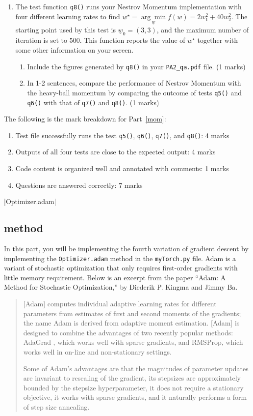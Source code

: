 \documentclass{article}
\theoremstyle{definition}
\begin{document}
\begin{enumerate}[label=\ref{mom}.\alph*]
	\item \label{hhh}The test function \verb|q8()| runs your Nestrov Momentum implementation with four different learning rates to find $\underline{w}^\star = \underset{\underline{w}}{\arg \min} f(\underline{w}) = 2 w_1^2 + 40w_2^2$. The starting point used by this test is $\underline{w}_0=(3,3)$, and the maximum number of iteration is set to $500$. This function reports the value of $w^\star$ together with some other information on your screen.
	\begin{enumerate}[label=\ref{hhh}.\roman*]
		\item Include the figures generated by \verb|q8()| in your \verb|PA2_qa.pdf| file. (1 marks)
		\item In 1-2 sentences, compare the performance of Nestrov Momentum with the heavy-ball momentum by comparing the outcome of tests \verb|q5()| and \verb|q6()| with that of \verb|q7()| and \verb|q8()|. (1 marks)
	\end{enumerate}
\end{enumerate}
The following is the mark breakdown for Part~\ref{mom}:
\begin{enumerate}[label=(\roman*)]
	\item Test file successfully runs the test \verb|q5()|, \verb|q6()|, \verb|q7()|, and \verb|q8()|: 4 marks
	\item Outputs of all four tests are close to the expected output: 4 marks
	\item Code content is organized well and annotated with comments: 1 marks
	\item Questions are answered correctly: 7 marks
\end{enumerate}
|Optimizer.adam|
\subsection{ method}\label{adam}
In this part, you will be implementing the fourth variation of gradient descent by implementing the \verb|Optimizer.adam| method in the \verb|myTorch.py| file. Adam is a variant of stochastic optimization that only requires first-order gradients with little memory requirement. Below is an excerpt from the paper ``Adam: A Method for Stochastic Optimization,'' by Diederik P. Kingma and Jimmy Ba.
\begin{quote}
	[Adam] computes individual adaptive learning rates for
	different parameters from estimates of first and second moments of the gradients; the name Adam
	is derived from adaptive moment estimation. [Adam] is designed to combine the advantages
	of two recently popular methods: AdaGrad , which works well with sparse gradients, and RMSProp, which works well in on-line and non-stationary
	settings.
	
	Some of Adam's advantages are that the magnitudes of parameter updates are invariant to
	rescaling of the gradient, its stepsizes are approximately bounded by the stepsize hyperparameter,
	it does not require a stationary objective, it works with sparse gradients, and it naturally performs a
	form of step size annealing.
\end{quote}
\end{document}
